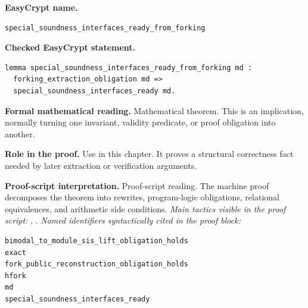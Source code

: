 \begin{formaltheorem}
\noindent\textbf{EasyCrypt name.}
\begin{lstlisting}[language=EasyCrypt,basicstyle=\ttfamily\scriptsize]
special_soundness_interfaces_ready_from_forking
\end{lstlisting}
\noindent\textbf{Checked EasyCrypt statement.}
\begin{lstlisting}[language=EasyCrypt,basicstyle=\ttfamily\scriptsize]
lemma special_soundness_interfaces_ready_from_forking md :
  forking_extraction_obligation md =>
  special_soundness_interfaces_ready md.
\end{lstlisting}
\noindent\textbf{Formal mathematical reading.}
Mathematical theorem. This is an implication, normally turning one invariant, validity predicate, or proof obligation into another.

\noindent\textbf{Role in the proof.}
Use in this chapter. It proves a structural correctness fact needed by later extraction or verification arguments.

\noindent\textbf{Proof-script interpretation.}
Proof-script reading. The machine proof decomposes the theorem into rewrites, program-logic obligations, relational equivalences, and arithmetic side conditions.
\emph{Main tactics visible in the proof script:} , .
\emph{Named identifiers syntactically cited in the proof block:}
\begin{lstlisting}[language=EasyCrypt,basicstyle=\ttfamily\scriptsize]
bimodal_to_module_sis_lift_obligation_holds
exact
fork_public_reconstruction_obligation_holds
hfork
md
special_soundness_interfaces_ready
\end{lstlisting}

\end{formaltheorem}

